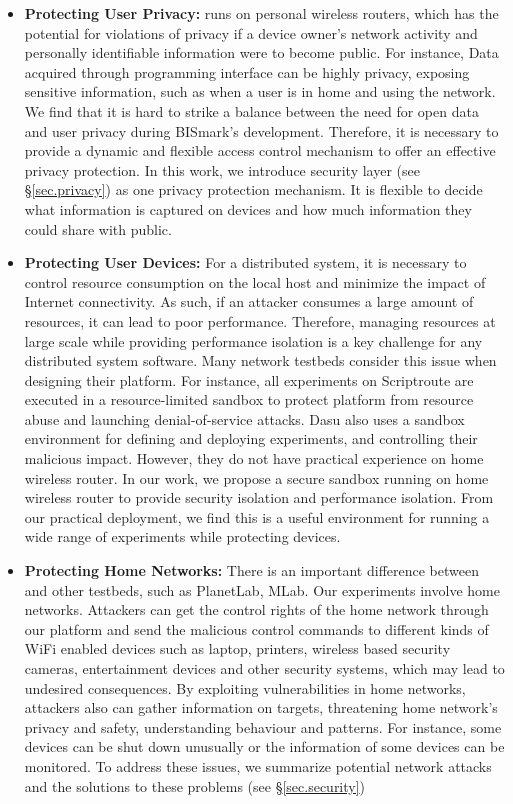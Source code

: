 \begin{itemize}
\item \textbf{Protecting User Privacy:} \sysname runs on personal wireless routers, which has the potential for violations of privacy if a device owner's network activity and personally identifiable information were to become public. For instance, Data acquired through programming interface can be highly privacy, exposing sensitive information, such as when a user is in home and using the network. We find that it is hard to strike a balance between the need for open data and user privacy during BISmark's development. Therefore, it is necessary to provide a dynamic and flexible access control mechanism to offer an effective privacy protection. In this work, we introduce security layer (see \S{\ref{sec.privacy}}) as one privacy protection mechanism. It is flexible to decide what information is captured on devices and how much information they could share with public. 

\item \textbf{Protecting User Devices:} For a distributed system, it is necessary to control resource consumption on the local host and minimize the impact of Internet connectivity. As such, if an attacker consumes a large amount of resources, it can lead to poor performance. Therefore, managing resources at large scale while providing performance isolation is a key challenge for any distributed system software. Many network testbeds consider this issue when designing their platform. For instance, all experiments on Scriptroute\cite{spring2003scriptroute} are executed in a resource-limited sandbox to protect platform from resource abuse and launching denial-of-service attacks. Dasu also uses a sandbox environment for defining and deploying experiments, and controlling their malicious impact. However, they do not have practical experience on home wireless router. In our work, we propose a secure sandbox running on home wireless router to provide security isolation and performance isolation. From our practical deployment, we find this is a useful environment for running a wide range of experiments while protecting devices.

\item \textbf{Protecting Home Networks:} There is an important difference between \sysname and other testbeds, such as PlanetLab, MLab. Our experiments involve home networks. Attackers can get the control rights of the home network through our platform and send the malicious control commands to different kinds of WiFi enabled devices such as laptop, printers, wireless based security cameras, entertainment devices and other security systems, which may lead to undesired consequences. By exploiting vulnerabilities in home networks, attackers also can gather information on targets, threatening home network's privacy and safety, understanding behaviour and patterns. For instance, some devices can be shut down unusually or the information of some devices can be monitored. To address these issues, we summarize potential network attacks and the solutions to these problems (see \S{\ref{sec.security}})
\end{itemize}

